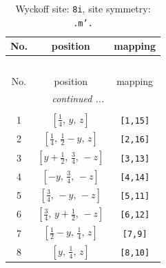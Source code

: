 \documentclass[fleqn,8pt]{jsarticle}
\begin{document}
\begin{longtable}{ccc}
\caption{Wyckoff site: {\tt 8i}, site symmetry: {\tt .m'.}}
 \\
 \hline \hline
No. & position & mapping \\ \hline \endfirsthead

\multicolumn{2}{l}{\tablename\ \thetable{}} \\
 \hline \hline
No. & position & mapping \\ \hline \endhead

 \hline \hline
\multicolumn{2}{r}{\footnotesize\it continued ...} \\ \endfoot

 \hline \hline
\multicolumn{2}{r}{} \\ \endlastfoot

1 & $\left[ \frac{1}{4},\, y,\, z \right]$ & {\tt [1,15]} \\ \hline
2 & $\left[ \frac{1}{4},\, \frac{1}{2} - y,\, z \right]$ & {\tt [2,16]} \\ \hline
3 & $\left[ y + \frac{1}{2},\, \frac{3}{4},\, - z \right]$ & {\tt [3,13]} \\ \hline
4 & $\left[ - y,\, \frac{3}{4},\, - z \right]$ & {\tt [4,14]} \\ \hline
5 & $\left[ \frac{3}{4},\, - y,\, - z \right]$ & {\tt [5,11]} \\ \hline
6 & $\left[ \frac{3}{4},\, y + \frac{1}{2},\, - z \right]$ & {\tt [6,12]} \\ \hline
7 & $\left[ \frac{1}{2} - y,\, \frac{1}{4},\, z \right]$ & {\tt [7,9]} \\ \hline
8 & $\left[ y,\, \frac{1}{4},\, z \right]$ & {\tt [8,10]} \\
\end{longtable}
\renewcommand{\arraystretch}{1.2}
\end{document}
